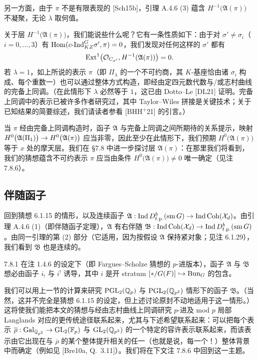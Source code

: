 另一方面，由于 $\pi$ 不是有限表现的 [Sch15b]，引理 A.4.6 (3) 蕴含 $H^{-1}\bigl(\mathfrak A(\pi)\bigr)$ 不凝聚，无论 $\lambda$ 取何值。

关于层 $H^{-1}\bigl(\mathfrak A(\pi)\bigr)$，我们能说些什么呢？它有一条性质如下：由于对 $\sigma'\neq\sigma_i$（$i=0,\dots,3$）有 $\operatorname{Hom}(c\text{-}\mathrm{Ind}_{KZ}^G\sigma',\pi)=0$，我们发现对任何这样的 $\sigma'$ 都有
\[
\operatorname{Ext}^1\bigl(\mathcal{O}_{C_{\sigma'}},H^{-1}(\mathfrak A(\pi))\bigr)=0.
\]
若 $\lambda=1$，如上所说的表示 $\pi$（即 $\Pi_\lambda$ 的一个不可约商，其 $K$-基座恰由诸 $\sigma_i$ 构成、每个重数一）也可以通过整体方式构造，即经由定四元数代数与/或志村曲线的完备上同调。（在此情形下 $\lambda$ 必然等于 $1$，这已由 Dotto--Le [DL21] 证明。完备上同调中的表示已被许多作者研究过，其中 Taylor--Wiles 拼接是关键技术；关于已知结果的简要综述，我们请读者参看 [BHH${}^{+}$21] 的引言。）

当 $\pi$ 经由完备上同调构造时，函子 $\mathfrak A$ 与完备上同调之间所期待的关系提示，映射 $H^0\bigl(\mathfrak A(\Pi_1)\bigr)\rightarrow H^0\bigl(\mathfrak A(\pi)\bigr)$ 应当非零，因此至少在此情形下，我们预期 $H^0\bigl(\mathfrak A(\pi)\bigr)$ 等于 $x$ 处的摩天层。我们在 §7.8 中进一步探讨层 $\mathfrak A(\pi)$：在那里我们将看到，我们的猜想蕴含不可约表示 $\pi$ 应当由条件 $H^0\bigl(\mathfrak A(\pi)\bigr)\neq0$ 唯一确定（见注 7.8.6）。

\subsection{伴随函子}
回到猜想 6.1.15 的情形，以及连续函子 $\mathfrak A:\operatorname{Ind} D^b_{\mathrm{f.p.}}(\mathrm{sm}\,G)\rightarrow\operatorname{Ind}\operatorname{Coh}(\mathcal{X}_d)$。由引理 A.4.6 (1)（即伴随函子定理），$\mathfrak A$ 有右伴随 $\mathfrak B:\operatorname{Ind}\operatorname{Coh}(\mathcal{X}_d)\rightarrow\operatorname{Ind} D^b_{\mathrm{f.p.}}(\mathrm{sm}\,G)$。由同一引理的第 (2) 部分（它适用，因为按假设 $\mathfrak A$ 保持紧对象；见注 6.1.29），我们看到 $\mathfrak B$ 也是连续的。

\begin{rem}{7.8.1}\label{rem:a4-7-8-1}
在注 1.4.6 的设定下（即 Fargues--Scholze 猜想的 $p$-进版本），函子 $\mathfrak A$ 与 $\mathfrak B$ 想必由函子 $i_!$ 与 $i^!$ 诱导，其中 $i$ 是开 stratum $[*/G(F)]\hookrightarrow\operatorname{Bun}_G$ 的包含。
\end{rem}

我们可以用上一节的计算来研究 $\mathrm{PGL}_2(\mathbb{Q}_p)$ 与 $\mathrm{PGL}_2(\mathbb{Q}_{p^2})$ 情形下的函子 $\mathfrak B$。（当然，这并不完全是猜想 6.1.15 的设定，但上述讨论原封不动地适用于这一情形。）这将使我们能把本文的猜想与经由志村曲线上同调研究 $p$-进及 mod $p$ 局部 Langlands 对应的更传统途径联系起来，尤其与下述希望联系起来：可以把每个表示 $\overline{\rho}:\operatorname{Gal}_{\mathbb{Q}_{p^2}}\rightarrow\mathrm{GL}_2(\mathbb{F}_p)$ 与 $\mathrm{GL}_2(\mathbb{Q}_{p^2})$ 的一个特定的容许表示联系起来，而该表示由它出现在与 $\overline{\rho}$ 的某个整体提升相关的任一（也就是说，每一个！）整体背景中而确定（例如见 [Bre10a, Q.\ 3.11]）。我们将在下文注 7.8.6 中回到这一主题。

